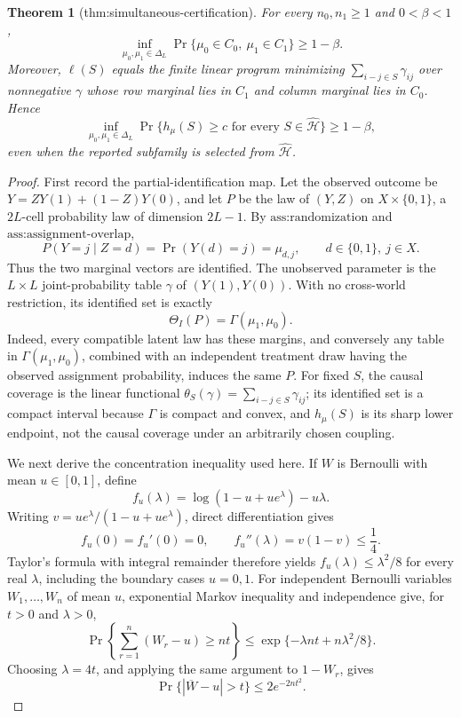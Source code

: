 \documentclass{article}
\newtheorem{theorem}{Theorem}
\begin{document}
\begin{theorem}[thm:simultaneous-certification]\label{thm:simultaneous-certification}
For every \(n_0,n_1\geq1\) and \(0<\beta<1\), \[\inf_{\mu_0,\mu_1\in\Delta_L}\Pr\{\mu_0\in C_0,\ \mu_1\in C_1\}\geq1-\beta.\] Moreover, \(\ell(S)\) equals the finite linear program minimizing \(\sum_{i-j\in S}\gamma_{ij}\) over nonnegative \(\gamma\) whose row marginal lies in \(C_1\) and column marginal lies in \(C_0\). Hence \[\inf_{\mu_0,\mu_1\in\Delta_L}\Pr\{h_{\mu}(S)\geq c\text{ for every }S\in\widehat{\mathcal H}\}\geq1-\beta,\] even when the reported subfamily is selected from \(\widehat{\mathcal H}\).
\end{theorem}
\begin{proof}
First record the partial-identification map.  Let the observed outcome be \(Y=ZY(1)+(1-Z)Y(0)\), and let \(P\) be the law of \((Y,Z)\) on \(X\times\{0,1\}\), a \(2L\)-cell probability law of dimension \(2L-1\).  By \(\text{ass:randomization}\) and \(\text{ass:assignment-overlap}\),
\[
P(Y=j\mid Z=d)=\Pr(Y(d)=j)=\mu_{d,j},
\qquad d\in\{0,1\},\ j\in X.
\]
Thus the two marginal vectors are identified.  The unobserved parameter is the \(L\times L\) joint-probability table \(\gamma\) of \((Y(1),Y(0))\).  With no cross-world restriction, its identified set is exactly
\[
\Theta_I(P)=\Gamma(\mu_1,\mu_0).
\]
Indeed, every compatible latent law has these margins, and conversely any table in \(\Gamma(\mu_1,\mu_0)\), combined with an independent treatment draw having the observed assignment probability, induces the same \(P\).  For fixed \(S\), the causal coverage is the linear functional \(\theta_S(\gamma)=\sum_{i-j\in S}\gamma_{ij}\); its identified set is a compact interval because \(\Gamma\) is compact and convex, and \(h_{\mu}(S)\) is its sharp lower endpoint, not the causal coverage under an arbitrarily chosen coupling.

We next derive the concentration inequality used here.  If \(W\) is Bernoulli with mean \(u\in[0,1]\), define
\[
f_u(\lambda)=\log(1-u+ue^\lambda)-u\lambda.
\]
Writing \(v=ue^\lambda/(1-u+ue^\lambda)\), direct differentiation gives
\[
f_u(0)=f_u'(0)=0,
\qquad
f_u''(\lambda)=v(1-v)\leq\frac14.
\]
Taylor's formula with integral remainder therefore yields \(f_u(\lambda)\leq\lambda^2/8\) for every real \(\lambda\), including the boundary cases \(u=0,1\).  For independent Bernoulli variables \(W_1,\ldots,W_n\) of mean \(u\), exponential Markov inequality and independence give, for \(t>0\) and \(\lambda>0\),
\[
\Pr\!\left\{\sum_{r=1}^n(W_r-u)\geq nt\right\}
\leq\exp\{-\lambda nt+n\lambda^2/8\}.
\]
Choosing \(\lambda=4t\), and applying the same argument to \(1-W_r\), gives
\[
\Pr\{|\overline W-u|>t\}\leq2e^{-2nt^2}. \tag{1}
\]


\end{proof}
\end{document}
